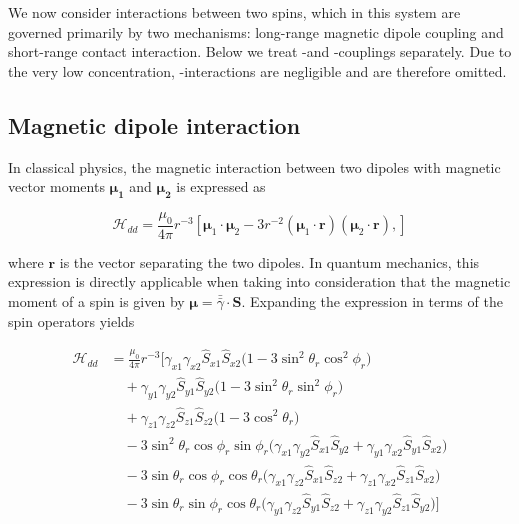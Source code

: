 We now consider interactions between two spins, which in this system are governed primarily by two mechanisms: long-range magnetic dipole coupling and short-range contact interaction. Below we treat \Er-\W and \W-\W couplings separately. Due to the very low \Er concentration, \Er-\Er interactions are negligible and are therefore omitted.

\subsection{Magnetic dipole interaction}

In classical physics, the magnetic interaction between two dipoles with magnetic vector moments $\boldsymbol{\mu_1}$ and $\boldsymbol{\mu_2}$ is expressed as

\begin{equation}
    \mathcal{H}_{dd} = \frac{\mu_0}{4\pi} r^{-3} 
    \left[ \boldsymbol{\mu}_1 \cdot \boldsymbol{\mu}_2 
    - 3r^{-2} (\boldsymbol{\mu}_1 \cdot \mathbf{r})(\boldsymbol{\mu}_2 \cdot \mathbf{r}), \right]
\end{equation}

\noindent where $\mathbf{r}$ is the vector separating the two dipoles. In quantum mechanics, this expression is directly applicable when taking into consideration that the magnetic moment of a spin is given by $\boldsymbol{\mu} = \bar{\bar{\gamma}} \cdot \mathbf{S}$. Expanding the expression in terms of the spin operators yields

\begin{equation}
\begin{aligned}
\mathcal{H}_{dd} &= 
\frac{\mu_0}{4\pi} r^{-3} \Big[ 
\gamma_{x1}\gamma_{x2} \hat{S}_{x1} \hat{S}_{x2} \big( 1 - 3 \sin^2 \theta_r \cos^2 \phi_r \big) \\
&\quad + \gamma_{y1}\gamma_{y2} \hat{S}_{y1} \hat{S}_{y2} \big( 1 - 3 \sin^2 \theta_r \sin^2 \phi_r \big) \\
&\quad + \gamma_{z1}\gamma_{z2} \hat{S}_{z1} \hat{S}_{z2} \big( 1 - 3 \cos^2 \theta_r \big) \\
&\quad - 3 \sin^2 \theta_r \cos \phi_r \sin \phi_r 
\big( \gamma_{x1}\gamma_{y2} \hat{S}_{x1} \hat{S}_{y2} + \gamma_{y1}\gamma_{x2} \hat{S}_{y1} \hat{S}_{x2} \big) \\
&\quad - 3 \sin \theta_r \cos \phi_r \cos \theta_r 
\big( \gamma_{x1}\gamma_{z2} \hat{S}_{x1} \hat{S}_{z2} + \gamma_{z1}\gamma_{x2} \hat{S}_{z1} \hat{S}_{x2} \big) \\
&\quad - 3 \sin \theta_r \sin \phi_r \cos \theta_r 
\big( \gamma_{y1}\gamma_{z2} \hat{S}_{y1} \hat{S}_{z2} + \gamma_{z1}\gamma_{y2} \hat{S}_{z1} \hat{S}_{y2} \big) 
\Big]
\end{aligned}
\end{equation}

